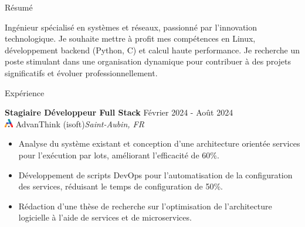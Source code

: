 \documentclass{resume}
\begin{document}
  \vspace{-2em}
  \begin{rSection}{Résumé}

    {Ingénieur spécialisé en systèmes et réseaux, passionné par l'innovation technologique. Je souhaite mettre à profit mes compétences en Linux, développement backend (Python, C) et calcul haute performance. Je recherche un poste stimulant dans une organisation dynamique pour contribuer à des projets significatifs et évoluer professionnellement.}
    
    \end{rSection}
    \vspace{-0.75em}
    \begin{rSection}{Expérience}
    
        \textbf{Stagiaire Développeur Full Stack} \hfill Février 2024 - Août 2024\\
        \href{https://www.advanthink.com}{\includegraphics[height=1em]{../Ressource/Logo Symbol A en couleur.png}} AdvanThink (isoft)\hfill \textit{Saint-Aubin, FR}
         \begin{itemize}
            \itemsep -6pt {} 
            \item Analyse du système existant et conception d'une architecture orientée services pour l'exécution par lots, améliorant l'efficacité de 60\%.
            \item Développement de scripts DevOps pour l'automatisation de la configuration des services, réduisant le temps de configuration de 50\%.
            \item Rédaction d'une thèse de recherche sur l'optimisation de l'architecture logicielle à l'aide de services et de microservices.
         \end{itemize}
    \end{rSection} 
    \vspace{-0.75em}
    
\end{document}
